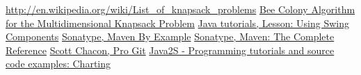 \documentclass[a4paper,12pt,notitlepage]{mwrep}
\begin{document}
\begin{thebibliography}{9}

	\href{http://en.wikipedia.org/wiki/List_of_knapsack_problems}{http://en.wikipedia.org/wiki/List\_of\_knapsack\_problems}
	\href{http://www.iaeng.org/publication/IMECS2008/IMECS2008_pp84-88.pdf}{Bee Colony Algorithm for the Multidimensional Knapsack Problem}
	\href{http://docs.oracle.com/javase/tutorial/uiswing/components/index.html}{Java tutorials, Lesson: Using Swing Components}
	\href{http://www.sonatype.com/Support/Books/Maven-By-Example}{Sonatype, Maven By Example}
	\href{http://www.sonatype.com/Support/Books/Maven-The-Complete-Reference}{Sonatype, Maven: The Complete Reference}
	\href{http://git-scm.com/book/}{Scott Chacon, Pro Git}
	\href{http://www.java2s.com/Code/Java/Chart/CatalogChart.htm}{Java2S - Programming tutorials and source code examples: Charting}

\end{thebibliography}


\label{LastPage}
\end{document}
